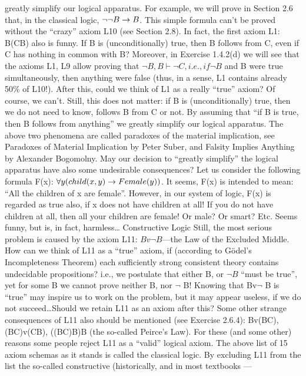 greatly simplify our logical apparatus. For example, we will prove in Section 2.6 that, in the classical
logic, \(\neg \neg B\rightarrow B\). This simple formula can't be proved without the ``crazy'' axiom L10 (see Section 2.8).
In fact, the first axiom L1: B\IMPLIES (C\IMPLIES B) also is funny. If B is (unconditionally) true, then B follows from C,
even if C has nothing in common with B? Moreover, in Exercise 1.4.2(d) we will see that the axioms L1,
L9 allow proving that \(\neg B, B \vdash \neg C, i.e., if \neg B\) and B were true simultaneously, then anything were false
(thus, in a sense, L1 contains already 50\% of L10!). After this, could we think of L1 as a really ``true''
axiom? Of course, we can't. Still, this does not matter: if B is (unconditionally) true, then we do not need
to know, follows B from C or not. By assuming that ``if B is true, then B follows from anything'' we
greatly simplify our logical apparatus.
The above two phenomena are called paradoxes of the material implication, see Paradoxes of Material
Implication by Peter Suber, and Falsity Implies Anything by Alexander Bogomolny.
May our decision to ``greatly simplify'' the logical apparatus have also some undesirable consequences?
Let us consider the following formula F(x): \(\forall y(child(x, y)\rightarrow Female(y))\).
It seems, F(x) is intended to mean: ``All the children of x are female''. However, in our system of logic, F(x) is regarded as true also, if
x does not have children at all! If you do not have children at all, then all your children are female! Or
male? Or smart? Etc. Seems funny, but is, in fact, harmless\ldots 
Constructive Logic
Still, the most serious problem is caused by the axiom L11: \(Bv\neg B\)---the Law of the Excluded Middle.
How can we think of L11 as a ``true'' axiom, if (according to G\"{o}del's Incompleteness Theorem) each sufficiently strong consistent theory contains undecidable propositions? i.e., we postulate that either B, or
\(\neg B\) ``must be true'', yet for some B we cannot prove neither B, nor \(\neg\) B! Knowing that Bv\(\neg\) B is ``true'' may
inspire us to work on the problem, but it may appear useless, if we do not succeed\ldots  Should we retain L11
as an axiom after this?
Some other strange consequences of L11 also should be mentioned (see Exercise 2.6.4):
Bv(B\IMPLIES C),
(B\IMPLIES C)v(C\IMPLIES B),
((B\IMPLIES C)\IMPLIES B)\IMPLIES B (the so-called Peirce's Law).
For these (and some other) reasons some people reject L11 as a ``valid'' logical axiom.
The above list of 15 axiom schemas as it stands is called the classical logic.
By excluding L11 from the list the so-called constructive (historically, and in most textbooks ---
